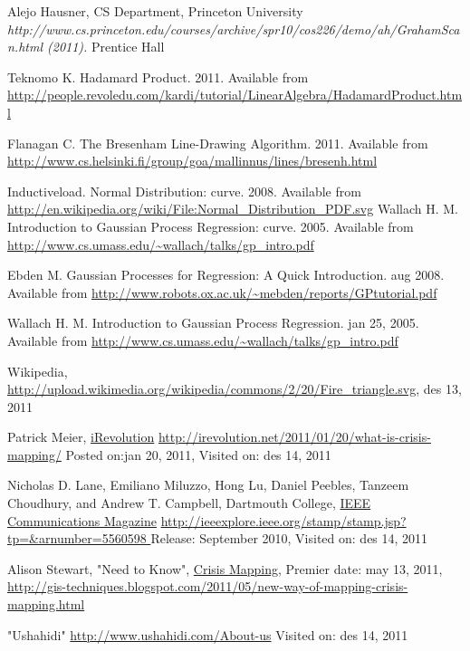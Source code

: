
\begin{thebibliography}{4}
 Alejo Hausner, CS Department, Princeton University
 \emph{http://www.cs.princeton.edu/courses/archive/spr10/cos226/demo/ah/GrahamScan.html (2011).} Prentice Hall
 
 Teknomo K. Hadamard Product. 2011. Available from \url{http://people.revoledu.com/kardi/tutorial/LinearAlgebra/HadamardProduct.html} 

 Flanagan C. The Bresenham Line-Drawing Algorithm. 2011. Available from \url{http://www.cs.helsinki.fi/group/goa/mallinnus/lines/bresenh.html} 

 Inductiveload. Normal Distribution: curve. 2008. Available from \url{http://en.wikipedia.org/wiki/File:Normal_Distribution_PDF.svg} 
 Wallach H. M. Introduction to Gaussian Process Regression: curve. 2005. Available from \url{http://www.cs.umass.edu/~wallach/talks/gp_intro.pdf} 

 Ebden M. Gaussian Processes for Regression: A Quick Introduction. aug 2008. Available from \url{http://www.robots.ox.ac.uk/~mebden/reports/GPtutorial.pdf} 


 Wallach H. M. Introduction to Gaussian Process Regression. jan 25, 2005. Available from \url{http://www.cs.umass.edu/~wallach/talks/gp_intro.pdf} 

 Wikipedia,       \url{http://upload.wikimedia.org/wikipedia/commons/2/20/Fire_triangle.svg}, des 13, 2011

 Patrick Meier, \underline{iRevolution} \url{http://irevolution.net/2011/01/20/what-is-crisis-mapping/} Posted on:jan 20, 2011, Visited on: des 14, 2011

 Nicholas D. Lane, Emiliano Miluzzo, Hong Lu, Daniel Peebles, Tanzeem Choudhury,
and Andrew T. Campbell, Dartmouth College, \underline{IEEE Communications Magazine} \url{http://ieeexplore.ieee.org/stamp/stamp.jsp?tp=&arnumber=5560598 } Release: September 2010, Visited on: des 14, 2011

 Alison Stewart, "Need to Know", \underline{Crisis Mapping}, Premier date: may 13, 2011, \url{http://gis-techniques.blogspot.com/2011/05/new-way-of-mapping-crisis-mapping.html}

 "Ushahidi" \url{http://www.ushahidi.com/About-us} Visited on: des 14, 2011


\end{thebibliography}
